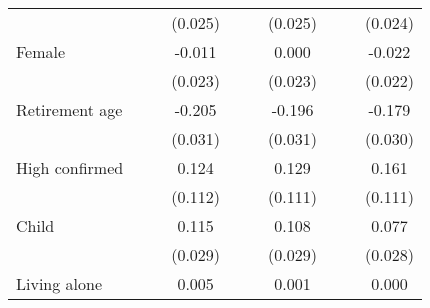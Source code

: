 {\begin{tabular}{l*{9}{c}}
                    &                     &                     &     (0.025)         &                     &                     &     (0.025)         &                     &                     &     (0.024)         \\
\addlinespace
Female              &                     &                     &      -0.011         &                     &                     &       0.000         &                     &                     &      -0.022         \\
                    &                     &                     &     (0.023)         &                     &                     &     (0.023)         &                     &                     &     (0.022)         \\
\addlinespace
Retirement age      &                     &                     &      -0.205\sym{***}&                     &                     &      -0.196\sym{***}&                     &                     &      -0.179\sym{***}\\
                    &                     &                     &     (0.031)         &                     &                     &     (0.031)         &                     &                     &     (0.030)         \\
\addlinespace
High confirmed      &                     &                     &       0.124         &                     &                     &       0.129         &                     &                     &       0.161         \\
                    &                     &                     &     (0.112)         &                     &                     &     (0.111)         &                     &                     &     (0.111)         \\
\addlinespace
Child               &                     &                     &       0.115\sym{***}&                     &                     &       0.108\sym{***}&                     &                     &       0.077\sym{***}\\
                    &                     &                     &     (0.029)         &                     &                     &     (0.029)         &                     &                     &     (0.028)         \\
\addlinespace
Living alone        &                     &                     &       0.005         &                     &                     &       0.001         &                     &                     &       0.000         \\

\end{tabular}}
